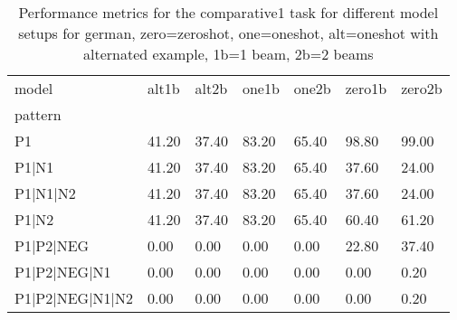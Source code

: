 \begin{table}[h]
\begin{tabular}{l|llllll}
\toprule
model & alt1b & alt2b & one1b & one2b & zero1b & zero2b \\
pattern &  &  &  &  &  &  \\
\midrule
P1 & 41.20 & 37.40 & 83.20 & 65.40 & 98.80 & 99.00 \\
P1|N1 & 41.20 & 37.40 & 83.20 & 65.40 & 37.60 & 24.00 \\
P1|N1|N2 & 41.20 & 37.40 & 83.20 & 65.40 & 37.60 & 24.00 \\
P1|N2 & 41.20 & 37.40 & 83.20 & 65.40 & 60.40 & 61.20 \\
P1|P2|NEG & 0.00 & 0.00 & 0.00 & 0.00 & 22.80 & 37.40 \\
P1|P2|NEG|N1 & 0.00 & 0.00 & 0.00 & 0.00 & 0.00 & 0.20 \\
P1|P2|NEG|N1|N2 & 0.00 & 0.00 & 0.00 & 0.00 & 0.00 & 0.20 \\
\bottomrule
\end{tabular}
\caption{Performance metrics for the comparative1 task for different model setups for german, zero=zeroshot, one=oneshot, alt=oneshot with alternated example, 1b=1 beam, 2b=2 beams}
\label{tab:de_comparative1_performance}
\end{table}
